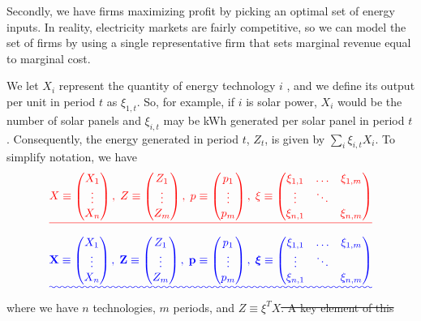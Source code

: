\documentclass[11pt,a4paper,leqno]{extarticle}
\providecommand{\DIFadd}[1]{{\protect\color{blue}\uwave{#1}}} %
\providecommand{\DIFdel}[1]{{\protect\color{red}\sout{#1}}}                      %
\providecommand{\DIFaddbegin}{} %
\providecommand{\DIFaddend}{} %
\providecommand{\DIFdelbegin}{} %
\providecommand{\DIFdelend}{} %
\begin{document}
	Secondly, we have firms maximizing profit by picking an optimal set of energy inputs. In reality, electricity markets are fairly competitive, so we can model the set of firms by using a single representative firm that sets marginal revenue equal to marginal cost. 
	
	We let $X_i$  represent the quantity of energy technology $i$ , and we define its output per unit in period $t$ as $\xi_{1,t}$. So, for example, if $i$ is solar power, $X_i$ would be the number of solar panels and $\xi_{i,t}$ may be kWh generated per solar panel in period $t$. Consequently, the energy generated in period $t$, $Z_t$, is given by $\sum_i \xi_{i,t} X_i$. To simplify notation, we have
	\DIFdelbegin \begin{eqnarray*}
		\DIFdel{X \equiv \begin{pmatrix}
				X_1\\
				\vdots\\
				X_n
			\end{pmatrix} ,\;
			Z \equiv \begin{pmatrix}
				Z_1\\
				\vdots\\
				Z_m
			\end{pmatrix} ,\;
			p \equiv \begin{pmatrix}
				p_1\\
				\vdots\\
				p_m
			\end{pmatrix} ,\;
			\xi \equiv \begin{pmatrix}
				\xi_{1,1} & \dots & \xi_{1,m}\\
				\vdots & \ddots & \\
				\xi_{n,1} &  & \xi_{n,m}
			\end{pmatrix} 
	}\end{eqnarray*}%
	\DIFdelend \DIFaddbegin \begin{align}
	\DIFadd{\mathbf{X} \equiv \begin{pmatrix}
		X_1\\
		\vdots\\
		X_n
		\end{pmatrix} ,\;
		\mathbf{Z} \equiv \begin{pmatrix}
		Z_1\\
		\vdots\\
		Z_m
		\end{pmatrix} ,\;
		\mathbf{p} \equiv \begin{pmatrix}
		p_1\\
		\vdots\\
		p_m
		\end{pmatrix} ,\;
		\boldsymbol{\xi} \equiv \begin{pmatrix}
		\xi_{1,1} & \dots & \xi_{1,m}\\
		\vdots & \ddots & \\
		\xi_{n,1} &  & \xi_{n,m}
		\end{pmatrix} 
	}\end{align}\DIFaddend 
	where we have $n$ technologies, $m$ periods, and \DIFdelbegin \DIFdel{$Z \equiv \xi^T X$. 
		A key element of this }\DIFdelend \DIFaddbegin \DIFadd{$\mathbf{Z} \equiv \boldsymbol{\xi}^T \mathbf{X}$. 
	}
	
\end{document}
